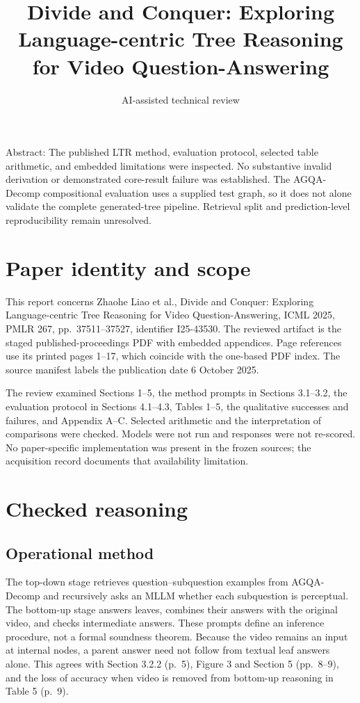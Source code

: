 \documentclass[10pt]{article}
\title{Divide and Conquer: Exploring Language-centric Tree Reasoning for Video Question-Answering}
\author{AI-assisted technical review}
\date{}
\begin{document}
\maketitle
Abstract: The published LTR method, evaluation protocol, selected table arithmetic, and embedded limitations were inspected. No substantive invalid derivation or demonstrated core-result failure was established. The AGQA-Decomp compositional evaluation uses a supplied test graph, so it does not alone validate the complete generated-tree pipeline. Retrieval split and prediction-level reproducibility remain unresolved.\par
\section*{Paper identity and scope}
This report concerns Zhaohe Liao et al., Divide and Conquer: Exploring Language-centric Tree Reasoning for Video Question-Answering, ICML 2025, PMLR 267, pp. 37511–37527, identifier I25-43530. The reviewed artifact is the staged published-proceedings PDF with embedded appendices. Page references use its printed pages 1–17, which coincide with the one-based PDF index. The source manifest labels the publication date 6 October 2025.\par
The review examined Sections 1–5, the method prompts in Sections 3.1–3.2, the evaluation protocol in Sections 4.1–4.3, Tables 1–5, the qualitative successes and failures, and Appendix A–C. Selected arithmetic and the interpretation of comparisons were checked. Models were not run and responses were not re-scored. No paper-specific implementation was present in the frozen sources; the acquisition record documents that availability limitation.\par
\section*{Checked reasoning}
\subsection*{Operational method}
The top-down stage retrieves question–subquestion examples from AGQA-Decomp and recursively asks an MLLM whether each subquestion is perceptual. The bottom-up stage answers leaves, combines their answers with the original video, and checks intermediate answers. These prompts define an inference procedure, not a formal soundness theorem. Because the video remains an input at internal nodes, a parent answer need not follow from textual leaf answers alone. This agrees with Section 3.2.2 (p. 5), Figure 3 and Section 5 (pp. 8–9), and the loss of accuracy when video is removed from bottom-up reasoning in Table 5 (p. 9).\par
\end{document}
